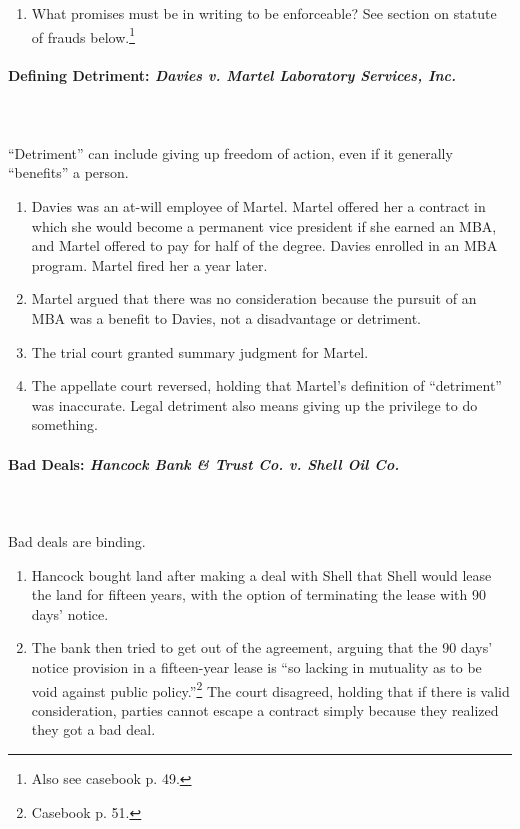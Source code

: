 \begin{enumerate}
    \item What promises must be in writing to be enforceable? See section on 
    statute of frauds below.\footnote{Also see casebook p. 49.}
\end{enumerate}

\paragraph{Defining Detriment: \emph{Davies v. Martel Laboratory Services, 
Inc.}}
~\\\\
``Detriment'' can include giving up freedom of action, even if it generally 
``benefits'' a person.

\begin{enumerate}
    \item Davies was an at-will employee of Martel. Martel offered her a 
    contract in which she would become a permanent vice president if she 
    earned an MBA, and Martel offered to pay for half of the degree. Davies 
    enrolled in an MBA program. Martel fired her a year later.
    \item Martel argued that there was no consideration because the pursuit of 
    an MBA was a benefit to Davies, not a disadvantage or detriment.
    \item The trial court granted summary judgment for Martel.
    \item The appellate court reversed, holding that Martel's definition of 
    ``detriment'' was inaccurate. Legal detriment also means giving up the 
    privilege to do something.
\end{enumerate}

\paragraph{Bad Deals: \emph{Hancock Bank \& Trust Co. v. Shell Oil Co.}}
~\\\\
Bad deals are binding.

\begin{enumerate}
    \item Hancock bought land after making a deal with Shell that Shell would 
    lease the land for fifteen years, with the option of terminating the lease 
    with 90 days' notice.
    \item The bank then tried to get out of the agreement, arguing that the 90 
    days' notice provision in a fifteen-year lease is ``so lacking in 
    mutuality as to be void against public policy.''\footnote{Casebook p. 51.} 
    The court disagreed, holding that if there is valid consideration, parties 
    cannot escape a contract simply because they realized they got a bad deal.
\end{enumerate}

